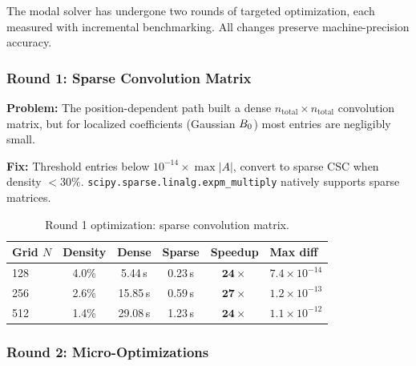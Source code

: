 The modal solver has undergone two rounds of targeted optimization, each measured with incremental benchmarking. All changes preserve machine-precision accuracy.

\subsubsection{Round 1: Sparse Convolution Matrix}
\label{sec:modal-opt-round1}

\textbf{Problem:} The position-dependent path built a dense $n_\text{total}\times n_\text{total}$ convolution matrix, but for localized coefficients (Gaussian $B_0$) most entries are negligibly small.

\textbf{Fix:} Threshold entries below $10^{-14} \times \max|A|$, convert to sparse CSC when density $< 30\%$. \texttt{scipy.sparse.linalg.expm\_multiply} natively supports sparse matrices.

\begin{table}[htbp]
\centering
\caption{Round 1 optimization: sparse convolution matrix.}
\label{tab:modal-opt-round1}
\begin{tabular}{@{}lccccl@{}}
\toprule
Grid $N$ & Density & Dense & Sparse & Speedup & Max diff \\
\midrule
128 & 4.0\% & 5.44\,s & 0.23\,s & $\mathbf{24\times}$ & $7.4\times 10^{-14}$ \\
256 & 2.6\% & 15.85\,s & 0.59\,s & $\mathbf{27\times}$ & $1.2\times 10^{-13}$ \\
512 & 1.4\% & 29.08\,s & 1.23\,s & $\mathbf{24\times}$ & $1.1\times 10^{-12}$ \\
\bottomrule
\end{tabular}
\end{table}

\subsubsection{Round 2: Micro-Optimizations}
\label{sec:modal-opt-round2}

